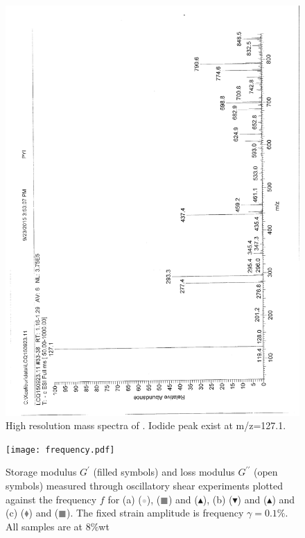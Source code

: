 \documentclass[journal=jacsat,manuscript=article]{achemso}
\begin{document}
\begin{figure}
\includegraphics[height=\textheight-2\baselineskip]{mass_PPyI.png}
\caption{High resolution mass spectra of . Iodide peak exist at m/z=127.1.}
\label{fig:massPPyI}
\end{figure}

\begin{figure}
\texttt{[image: frequency.pdf]}
\caption{Storage modulus $G^\prime$ (filled symbols) and loss modulus $G^{\prime\prime}$ (open symbols) measured through oscillatory shear experiments plotted against the frequency $f$ for (a)  (\textcolor{lightgray}{$\bullet$}),  (\textcolor{gray}{$\blacksquare$}) and  ($\blacktriangle$), (b)  ($\blacktriangledown$) and  ($\blacktriangle$) and (c)  (\textcolor{gray}{$\blacklozenge$}) and  (\textcolor{gray}{$\blacksquare$}). The fixed strain amplitude is frequency $\gamma=0.1\%$. All samples are at 8\%wt }
\label{fig:frequency}
\end{figure}
\end{document}

